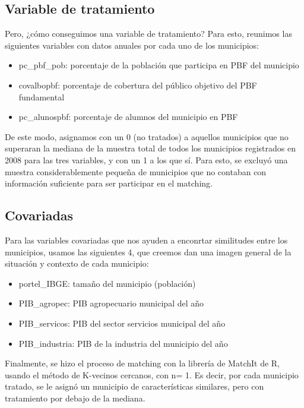 \documentclass[
]{article}
\providecommand{\tightlist}{%
  \setlength{\itemsep}{0pt}\setlength{\parskip}{0pt}}
\begin{document}
\hypertarget{variable-de-tratamiento}{%
\subsection{Variable de tratamiento}\label{variable-de-tratamiento}}

Pero, ¿cómo conseguimos una variable de tratamiento? Para esto, reunimos
las siguientes variables con datos anuales por cada uno de los
municipios:

\begin{itemize}
\tightlist
\item
  pc\_pbf\_pob: porcentaje de la población que participa en PBF del
  municipio
\item
  covalbopbf: porcentaje de cobertura del público objetivo del PBF
  fundamental
\item
  pc\_alunospbf: porcentaje de alumnos del municipio en PBF
\end{itemize}

De este modo, asignamos con un 0 (no tratados) a aquellos municipios que
no superaran la mediana de la muestra total de todos los municipios
registrados en 2008 para las tres variables, y con un 1 a los que sí.
Para esto, se excluyó una muestra considerablemente pequeña de
municipios que no contaban con información suficiente para ser
participar en el matching.

\hypertarget{covariadas}{%
\subsection{Covariadas}\label{covariadas}}

Para las variables covariadas que nos ayuden a enconrtar similitudes
entre los municipios, usamos las siguientes 4, que creemos dan una
imagen general de la situación y contexto de cada municipio:

\begin{itemize}
\tightlist
\item
  portel\_IBGE: tamaño del municipio (población)
\item
  PIB\_agropec: PIB agropecuario municipal del año
\item
  PIB\_servicos: PIB del sector servicios municipal del año
\item
  PIB\_industria: PIB de la industria del municipio del año
\end{itemize}

Finalmente, se hizo el proceso de matching con la librería de MatchIt de
R, usando el método de K-vecinos cercanos, con n= 1. Es decir, por cada
municipio tratado, se le asignó un municipio de características
similares, pero con tratamiento por debajo de la mediana.
\end{document}
